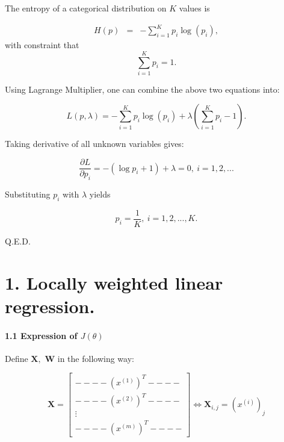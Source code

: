\documentclass[english,11pt]{article}
\begin{document}
The entropy of a categorical distribution on $K$ values is 

\begin{eqnarray}
H(p) & = & -\sum_{i=1}^{K}p_{i}\log(p_{i}),
\end{eqnarray}
with constraint that 
\begin{equation}
\sum_{i=1}^{K}p_{i}=1.    
\end{equation}


Using Lagrange Multiplier, one can combine the above two equations
into:

\begin{equation}
L(p,\lambda)=-\sum_{i=1}^{K}p_{i}\log(p_{i})+\lambda(\sum_{i=1}^{K}p_{i}-1).    
\end{equation}


Taking derivative of all unknown variables gives:

\begin{equation}
\frac{\partial L}{\partial p_{i}}=-(\log p_{i}+1)+\lambda=0,\ i=1,2,...    
\end{equation}


Substituting $p_{i}$ with $\lambda$ yields


\begin{equation}
p_{i}=\frac{1}{K},\ i=1,2,...,K.    
\end{equation}

Q.E.D.





\part*{1. Locally weighted linear regression.}

\subsection*{1.1 Expression of $J(\theta)$}

Define $\boldsymbol{X},$ $\boldsymbol{W}$ in the following way:


\begin{equation}
\boldsymbol{X}=\left[\begin{array}{c}
----\left(x^{(1)}\right)^{T}----\\
----\left(x^{(2)}\right)^{T}----\\
\vdots\\
----\left(x^{(m)}\right)^{T}----
\end{array}\right]\Longleftrightarrow\boldsymbol{X}_{i,j}=(x^{(i)})_{j}    
\end{equation}
\end{document}
